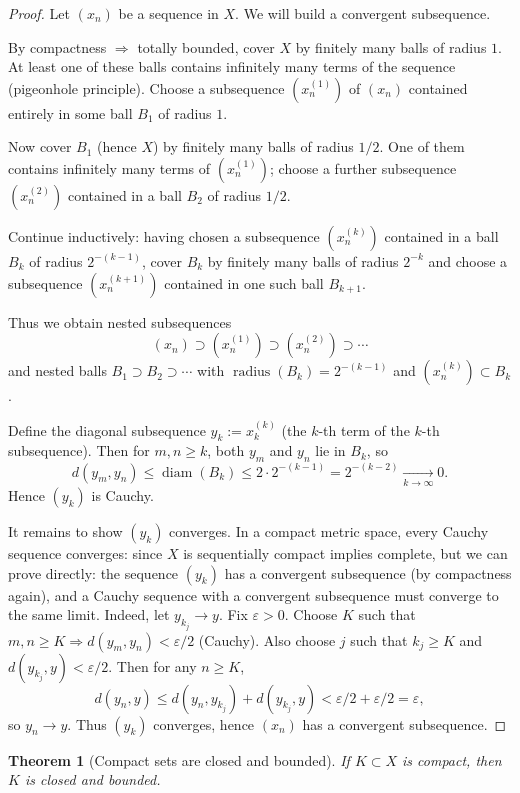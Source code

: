 \documentclass[11pt]{article}
\newtheorem{theorem}{Theorem}[section]
\theoremstyle{definition}
\newcommand{\eps}{\varepsilon}
\newcommand{\diam}{\operatorname{diam}}
\begin{document}
\begin{proof}
Let $(x_n)$ be a sequence in $X$. We will build a convergent subsequence.

By compactness $\Rightarrow$ totally bounded, cover $X$ by finitely many balls of radius $1$.
At least one of these balls contains infinitely many terms of the sequence (pigeonhole principle).
Choose a subsequence $(x^{(1)}_n)$ of $(x_n)$ contained entirely in some ball $B_1$ of radius $1$.

Now cover $B_1$ (hence $X$) by finitely many balls of radius $1/2$.
One of them contains infinitely many terms of $(x^{(1)}_n)$; choose a further subsequence $(x^{(2)}_n)$ contained in a ball $B_2$ of radius $1/2$.

Continue inductively: having chosen a subsequence $(x^{(k)}_n)$ contained in a ball $B_k$ of radius $2^{-(k-1)}$,
cover $B_k$ by finitely many balls of radius $2^{-k}$ and choose a subsequence $(x^{(k+1)}_n)$ contained in one such ball $B_{k+1}$.

Thus we obtain nested subsequences
\[
(x_n) \supset (x^{(1)}_n)\supset (x^{(2)}_n)\supset \cdots
\]
and nested balls $B_1\supset B_2\supset \cdots$ with $\operatorname{radius}(B_k)=2^{-(k-1)}$ and $(x^{(k)}_n)\subset B_k$.

Define the diagonal subsequence $y_k:=x^{(k)}_k$ (the $k$-th term of the $k$-th subsequence).
Then for $m,n\ge k$, both $y_m$ and $y_n$ lie in $B_k$, so
\[
d(y_m,y_n)\le \diam(B_k)\le 2\cdot 2^{-(k-1)}=2^{-(k-2)}\xrightarrow[k\to\infty]{}0.
\]
Hence $(y_k)$ is Cauchy.

It remains to show $(y_k)$ converges. In a compact metric space, every Cauchy sequence converges:
since $X$ is sequentially compact implies complete, but we can prove directly:
the sequence $(y_k)$ has a convergent subsequence (by compactness again), and a Cauchy sequence with a convergent subsequence must converge to the same limit.
Indeed, let $y_{k_j}\to y$. Fix $\eps>0$.
Choose $K$ such that $m,n\ge K\Rightarrow d(y_m,y_n)<\eps/2$ (Cauchy).
Also choose $j$ such that $k_j\ge K$ and $d(y_{k_j},y)<\eps/2$.
Then for any $n\ge K$,
\[
d(y_n,y)\le d(y_n,y_{k_j})+d(y_{k_j},y)<\eps/2+\eps/2=\eps,
\]
so $y_n\to y$.
Thus $(y_k)$ converges, hence $(x_n)$ has a convergent subsequence.
\end{proof}

\begin{theorem}[Compact sets are closed and bounded]
If $K\subset X$ is compact, then $K$ is closed and bounded.
\end{theorem}
\end{document}
